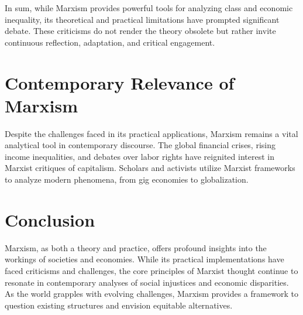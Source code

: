 \documentclass[14pt, russian]{matmex-diploma-custom}
\begin{document}
In sum, while Marxism provides powerful tools for analyzing class and economic inequality, its theoretical and practical limitations have prompted significant debate. These criticisms do not render the theory obsolete but rather invite continuous reflection, adaptation, and critical engagement.

\section{Contemporary Relevance of Marxism}
Despite the challenges faced in its practical applications, Marxism remains a vital analytical tool in contemporary discourse. The global financial crises, rising income inequalities, and debates over labor rights have reignited interest in Marxist critiques of capitalism. Scholars and activists utilize Marxist frameworks to analyze modern phenomena, from gig economies to globalization.
\section{Conclusion}
Marxism, as both a theory and practice, offers profound insights into the workings of societies and economies. While its practical implementations have faced criticisms and challenges, the core principles of Marxist thought continue to resonate in contemporary analyses of social injustices and economic disparities. As the world grapples with evolving challenges, Marxism provides a framework to question existing structures and envision equitable alternatives.



\end{document}
